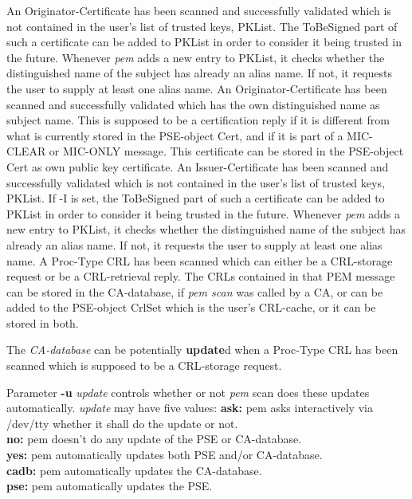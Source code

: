 \bi
\m An Originator-Certificate has been scanned and successfully validated which is not
   contained in the user's list of trusted keys, PKList. The ToBeSigned part of such
   a certificate can be added to PKList in order to consider it being trusted in the future.
   Whenever {\em pem} adds a new entry to PKList, it checks whether the distinguished
   name of the subject has already an alias name. If not, it requests the user to
   supply at least one alias name.  
\m An Originator-Certificate has been scanned and successfully validated which has the
   own distinguished name as subject name. This is supposed to be a certification reply
   if it is different from what is currently stored in the PSE-object Cert, and if it
   is part of a MIC-CLEAR or MIC-ONLY message. This certificate can be stored in the
   PSE-object Cert as own public key certificate.
\m An Issuer-Certificate has been scanned and successfully validated which is not
   contained in the user's list of trusted keys, PKList. If -I is set, the ToBeSigned part of such
   a certificate can be added to PKList in order to consider it being trusted in the future.
   Whenever {\em pem} adds a new entry to PKList, it checks whether the distinguished
   name of the subject has already an alias name. If not, it requests the user to
   supply at least one alias name.  
\m A Proc-Type CRL has been scanned which can either be a CRL-storage request or be a
   CRL-retrieval reply. The CRLs contained in that PEM message can be stored in the CA-database,
   if {\em pem scan} was called by a CA, or can be added to the PSE-object CrlSet which is the
   user's CRL-cache, or it can be stored in both.
\ei

The {\em CA-database} can be potentially {\bf update}d when a Proc-Type CRL has been scanned
which is supposed to be a CRL-storage request.

Parameter {\bf -u} {\em update} controls whether or not {\em pem} scan does these updates automatically. 
{\em update} may have five values:
\bvtab
{\bf ask:}  \2 pem asks interactively via /dev/tty whether it shall do the update or not. \\
{\bf no:}   \2 pem doesn't do any update of the PSE or CA-database. \\
{\bf yes:}  \2 pem automatically updates both PSE and/or CA-database. \\
{\bf cadb:} \2 pem automatically updates the CA-database. \\
{\bf pse:}  \2 pem automatically updates the PSE. \\
\evtab

